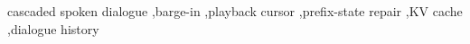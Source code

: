 \documentclass[preprint,12pt,authoryear]{elsarticle}
\begin{document}
\begin{frontmatter}
\begin{keyword}
cascaded spoken dialogue \sep barge-in \sep playback cursor \sep prefix-state repair \sep KV cache \sep dialogue history
\end{keyword}

\end{frontmatter}
\hypersetup{pageanchor=true}

\linenumbers











\end{document}
